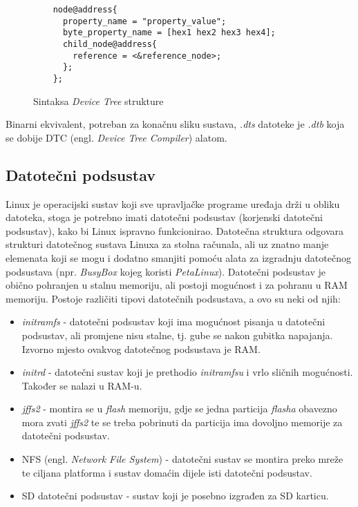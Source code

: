 \documentclass[times, utf8, diplomski, numeric]{fer}
\begin{document}
\begin{figure}[H]
  \centering
  \begin{lstlisting}
    node@address{
      property_name = "property_value";
      byte_property_name = [hex1 hex2 hex3 hex4];
      child_node@address{
        reference = <&reference_node>;
      };
    };
  \end{lstlisting}
  \caption{Sintaksa \textit{Device Tree} strukture}
  \label{devtree_sintax}
\end{figure}

Binarni ekvivalent, potreban za konačnu sliku sustava, \textit{.dts} datoteke je \textit{.dtb} koja se dobije DTC (engl.
\textit{Device Tree Compiler}) alatom.

\subsection{Datotečni podsustav}
Linux je operacijski sustav koji sve upravljačke programe uređaja drži u obliku datoteka, stoga je potrebno imati datotečni
podsustav (korjenski datotečni podsustav), kako bi Linux ispravno funkcionirao. Datotečna struktura odgovara strukturi
datotečnog sustava Linuxa za stolna računala, ali uz znatno manje elemenata koji se mogu i dodatno smanjiti pomoću alata
za izgradnju datotečnog podsustava (npr. \textit{BusyBox} kojeg koristi \textit{PetaLinux}). Datotečni podsustav je obično
pohranjen u stalnu memoriju, ali postoji mogućnost i za pohranu u RAM memoriju.
Postoje različiti tipovi datotečnih podsustava, a ovo su neki od njih:
\begin{itemize}
  \item{\textit{initramfs} - datotečni podsustav koji ima mogućnost pisanja u datotečni podsustav, ali promjene nisu stalne,
  tj. gube se nakon gubitka napajanja. Izvorno mjesto ovakvog datotečnog podsustava je RAM.}
  \item{\textit{initrd} - datotečni sustav koji je prethodio \textit{initramfsu} i vrlo sličnih mogućnosti. Također se nalazi
  u RAM-u.}
  \item{\textit{jffs2} - montira se u \textit{flash} memoriju, gdje se jedna particija \textit{flasha} obavezno mora zvati
  \textit{jffs2} te se treba pobrinuti da particija ima dovoljno memorije za datotečni podsustav.}
  \item{NFS (engl. \textit{Network File System}) - datotečni sustav se montira preko mreže te ciljana platforma i sustav
  domaćin dijele isti datotečni podsustav.}
  \item{SD datotečni podsustav - sustav koji je posebno izgrađen za SD karticu.}
\end{itemize}
\end{document}
